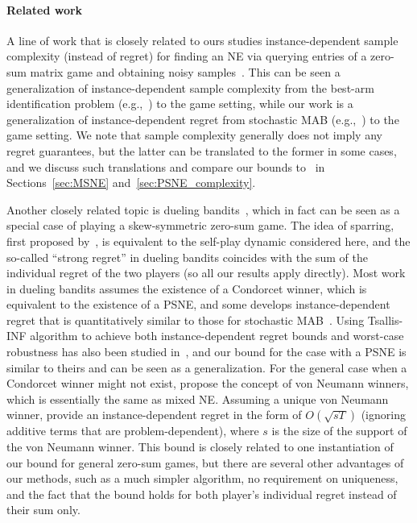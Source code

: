 \paragraph{Related work}
A line of work that is closely related to ours studies instance-dependent sample complexity (instead of regret) for finding an NE via querying entries of a zero-sum matrix game and obtaining noisy samples~\citep{maiti2023instance, maiti2024midsearch}.
This can be seen a generalization of instance-dependent sample complexity from the best-arm identification problem (e.g.,~\citealp{jamieson2014best}) to the game setting,
while our work is a generalization of instance-dependent regret from stochastic MAB (e.g.,~\citealp{auer2002using,garivier2011kl}) to the game setting.
We note that sample complexity generally does not imply any regret guarantees,  
but the latter can be translated to the former in some cases,
and we discuss such translations and compare our bounds to~\citet{maiti2023instance, maiti2024midsearch} in Sections~\ref{sec:MSNE} and~\ref{sec:PSNE_complexity}.

Another closely related topic is dueling bandits~\citep{yue2012k}, which in fact can be seen as a special case of playing a skew-symmetric zero-sum game.
The idea of sparring, first proposed by~\citet{ailon2014reducing}, is equivalent to the self-play dynamic considered here,
and the so-called ``strong regret'' in dueling bandits coincides with the sum of the individual regret of the two players (so all our results apply directly).
Most work in dueling bandits assumes the existence of a Condorcet winner, which is equivalent to the existence of a PSNE,
and some develops instance-dependent regret that is quantitatively similar to those for stochastic MAB~\citep{yue2011beat, yue2012k, zoghi2014relative}.
Using Tsallis-INF algorithm to achieve both instance-dependent regret bounds and worst-case robustness has also been studied in~\citet{zimmert2021tsallis, saha2022versatile, saad2024weak},
and our bound for the case with a PSNE is similar to theirs and can be seen as a generalization.
For the general case when a Condorcet winner might not exist, \citet{dudik2015contextual} propose the concept of von Neumann winners, which is essentially the same as mixed NE.
Assuming a unique von Neumann winner,
\citet{balsubramani2016instance} provide an instance-dependent regret in the form of $O(\sqrt{sT})$ (ignoring additive terms that are problem-dependent), where $s$ is the size of the support of the von Neumann winner.
This bound is closely related to one instantiation of our bound for general zero-sum games, but there are several other advantages of our methods, such as a much simpler algorithm, no requirement on uniqueness, and the fact that the bound holds for both player's individual regret instead of their sum only. %


